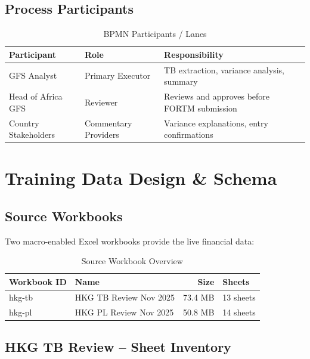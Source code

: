 \documentclass[11pt,a4paper]{article}
\begin{document}
\subsection{Process Participants}

\begin{table}[H]
\centering
\caption{BPMN Participants / Lanes}
\begin{tabularx}{\textwidth}{llX}
\toprule
\textbf{Participant} & \textbf{Role} & \textbf{Responsibility} \\
\midrule
GFS Analyst          & Primary Executor    & TB extraction, variance analysis, summary \\
Head of Africa GFS   & Reviewer            & Reviews and approves before FORTM submission \\
Country Stakeholders & Commentary Providers & Variance explanations, entry confirmations \\
\bottomrule
\end{tabularx}
\end{table}

\newpage
\section{Training Data Design \& Schema}
\label{sec:training}

\subsection{Source Workbooks}

Two macro-enabled Excel workbooks provide the live financial data:

\begin{table}[H]
\centering
\caption{Source Workbook Overview}
\begin{tabular}{llrl}
\toprule
\textbf{Workbook ID} & \textbf{Name} & \textbf{Size} & \textbf{Sheets} \\
\midrule
hkg-tb & HKG TB Review Nov 2025 & 73.4 MB & 13 sheets \\
hkg-pl & HKG PL Review Nov 2025 & 50.8 MB & 14 sheets \\
\bottomrule
\end{tabular}
\end{table}

\subsection{HKG TB Review -- Sheet Inventory}
\end{document}
